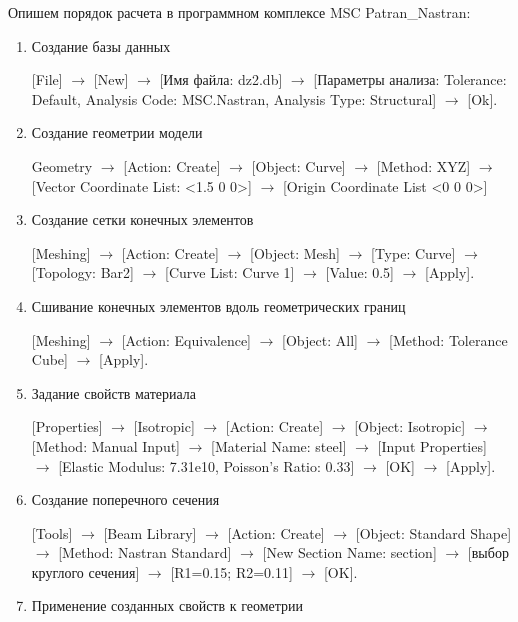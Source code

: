 Опишем порядок расчета в программном комплексе MSC Patran\_Nastran:
\begin{enumerate}
    \item Создание базы данных
    
    [File] $\rightarrow$ [New] $\rightarrow$ [Имя файла: dz2.db] $\rightarrow$ [Параметры анализа: Tolerance: Default, Analysis Code: MSC.Nastran, Analysis Type: Structural] $\rightarrow$ [Ok].

    \item Создание геометрии модели
    
    Geometry $\rightarrow$ [Action: Create] $\rightarrow$ [Object: Curve] $\rightarrow$ [Method: XYZ] $\rightarrow$ [Vector Coordinate List: <1.5 0 0>] $\rightarrow$ [Origin Coordinate List <0 0 0>]

    \item Создание сетки конечных элементов
    
    [Meshing] $\rightarrow$ [Action: Create] $\rightarrow$ [Object: Mesh] $\rightarrow$ [Type: Curve] $\rightarrow$ [Topology: Bar2] $\rightarrow$ [Curve List: Curve 1] $\rightarrow$ [Value: 0.5] $\rightarrow$ [Apply].

    \item Сшивание конечных элементов вдоль геометрических границ
    
    [Meshing] $\rightarrow$ [Action: Equivalence] $\rightarrow$ [Object: All] $\rightarrow$ [Method: Tolerance Cube] $\rightarrow$ [Apply].

    \item Задание свойств материала
    
    [Properties] $\rightarrow$ [Isotropic] $\rightarrow$ [Action: Create] $\rightarrow$ [Object: Isotropic] $\rightarrow$ [Method: Manual Input] $\rightarrow$ [Material Name: steel] $\rightarrow$ [Input Properties] $\rightarrow$ [Elastic Modulus: 7.31e10, Poisson’s Ratio: 0.33] $\rightarrow$ [OK] $\rightarrow$ [Apply].

    \item Создание поперечного сечения 
    
    [Tools] $\rightarrow$ [Beam Library] $\rightarrow$ [Action: Create] $\rightarrow$ [Object: Standard Shape] $\rightarrow$ [Method: Nastran Standard] $\rightarrow$ [New Section Name: section] $\rightarrow$ [выбор круглого сечения] $\rightarrow$ [R1=0.15; R2=0.11] $\rightarrow$ [OK].

    \item Применение созданных свойств к геометрии
    

\end{enumerate}
